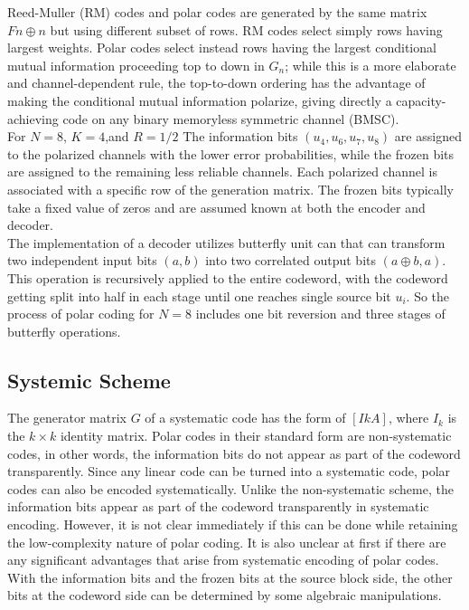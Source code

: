 \documentclass{report}
\begin{document}
Reed-Muller (RM) codes and polar codes are generated by the same matrix $Fn \oplus n$ but using different subset of rows. RM codes select simply rows having largest weights. Polar codes select instead rows having the largest conditional mutual information proceeding top to down in $G_n$; while this is a more elaborate and channel-dependent rule, the top-to-down ordering has the advantage of making the conditional mutual information polarize, giving directly a capacity-achieving code on any binary memoryless symmetric channel (BMSC).\\

For $N = 8$, $K=4$,and $R = 1/2$ The information bits $(u_4, u_6, u_7, u_8)$ are assigned to the polarized channels with the lower error probabilities, while the frozen bits are assigned to the remaining less reliable channels. Each polarized channel is associated with a specific row of the generation matrix. The frozen bits typically take a fixed value of zeros and are assumed known at both the encoder and decoder.\\

The implementation of a decoder utilizes butterfly unit can that can transform two independent input bits $(a, b)$ into two correlated output bits $(a \oplus b, a)$. This operation is recursively applied to the entire codeword, with the codeword getting split into half in each stage until one reaches single source bit $u_i$. So the process of polar coding for $N = 8$ includes one bit reversion and three stages of butterfly operations.

\subsection*{Systemic Scheme}
The generator matrix $G$ of a systematic code has the form of $[Ik A]$, where $I_{k}$ is the $k \times k$ identity matrix.
Polar codes in their standard form are non-systematic codes, in other words, the information bits do not appear as part of the codeword transparently. Since any linear code can be turned into a systematic code, polar codes can also be encoded systematically. Unlike the non-systematic scheme, the information bits appear as part of the codeword transparently in systematic encoding.
However, it is not clear immediately if this can be done while retaining the low-complexity nature of polar coding. It is also unclear at first if there are any significant advantages that arise from systematic encoding of polar codes. With the information bits and the frozen bits at the source block side, the other bits at the codeword side can be determined by some algebraic manipulations. 
\end{document}
